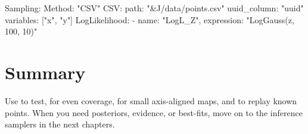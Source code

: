 \begin{yamlwin}
Sampling:
  Method: "CSV"
  CSV:
    path: "&J/data/points.csv"
    uuid_column: "uuid"
    variables: ["x", "y"]
  LogLikelihood:
    - {name: "LogL_Z", expression: "LogGauss(z, 100, 10)"}
\end{yamlwin}

\section{Summary}
\label{sec:basic-summary}

Use  to test,  for even coverage,  for small
axis-aligned maps, and  to replay known points. When you need posteriors, evidence,
or best-fits, move on to the inference samplers in the next chapters.
